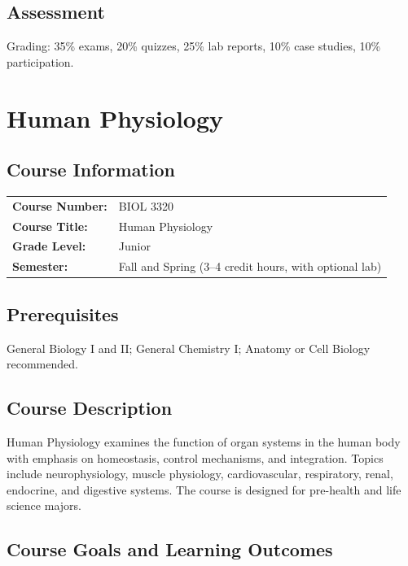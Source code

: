 \documentclass[12pt,oneside]{book}
\begin{document}
\section{Assessment}

Grading: 35\% exams, 20\% quizzes, 25\% lab reports, 10\% case studies, 10\% participation.


\chapter{Human Physiology}

\section{Course Information}

\begin{tabular}{ll}
\textbf{Course Number:} & BIOL 3320 \\
\textbf{Course Title:} & Human Physiology \\
\textbf{Grade Level:} & Junior \\
\textbf{Semester:} & Fall and Spring (3--4 credit hours, with optional lab) \\
\end{tabular}

\section{Prerequisites}

General Biology I and II; General Chemistry I; Anatomy or Cell Biology recommended.

\section{Course Description}

Human Physiology examines the function of organ systems in the human body with emphasis on homeostasis, control mechanisms, and integration. Topics include neurophysiology, muscle physiology, cardiovascular, respiratory, renal, endocrine, and digestive systems. The course is designed for pre-health and life science majors.

\section{Course Goals and Learning Outcomes}
\end{document}
